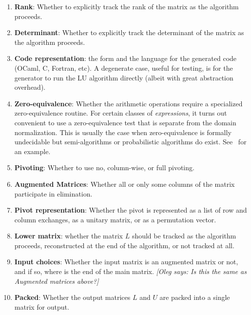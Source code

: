 \documentclass[draft]{elsart}
\newcommand{\oleg}[1]{{\it [Oleg says: #1]}}
\begin{document}
\begin{enumerate}
	\item \textbf{Rank}: Whether to explicitly track the rank of the matrix
		as the algorithm proceeds.
	\item \textbf{Determinant}:  Whether to explicitly track the determinant
		of the matrix as the algorithm proceeds.
	\item \textbf{Code representation}: the form and the language
	  for the generated code (OCaml, C, Fortran, etc). A
	  degenerate case, useful for testing, is for the generator
	  to run the LU algorithm directly (albeit with great
	  abstraction overhead).
	\item \textbf{Zero-equivalence}: Whether the 
		arithmetic operations require a specialized zero-equivalence 
		routine.  For certain classes
		of \emph{expressions}, it turns out convenient to use 
		a zero-equivalence
		test that is separate from the domain normalization.  This is
		usually the case when zero-equivalence is formally undecidable
		but semi-algorithms or probabilistic algorithms do exist.
		See~\cite{ZhCaJeMo06a} for an example.
    \item \textbf{Pivoting}: Whether to use no, 
        column-wise, or full pivoting.
    \item \textbf{Augmented Matrices}: Whether all or only some
      columns of the matrix participate in elimination.
	\item \textbf{Pivot representation}: Whether the pivot is represented
	  as a list of row and column exchanges, as a unitary matrix,
	  or as a permutation vector.
  \item \textbf{Lower matrix}: whether the matrix $L$ should be tracked
	  as the algorithm proceeds, reconstructed at the end of the
	  algorithm, or not tracked at all.
  \item \textbf{Input choices}: Whether the input matrix is an augmented
	  matrix or not, and if so, where is the end of the main matrix.
	  \oleg{Is this the same as Augmented matrices above?}
  \item \textbf{Packed}: Whether the output matrices $L$ and $U$ are
	  packed into a single matrix for output.
\setcounter{naspects}{\value{enumi}}
\end{enumerate}
\end{document}

